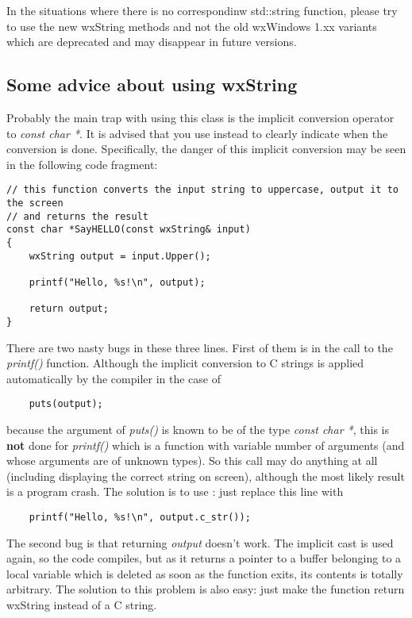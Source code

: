 In the situations where there is no correspondinw std::string function, please
try to use the new wxString methods and not the old wxWindows 1.xx variants
which are deprecated and may disappear in future versions.

\subsection{Some advice about using wxString}\label{wxstringadvices}

Probably the main trap with using this class is the implicit conversion operator to 
{\it const char *}. It is advised that you use 
instead to clearly indicate when the conversion is done. Specifically, the
danger of this implicit conversion may be seen in the following code fragment:

\begin{verbatim}
// this function converts the input string to uppercase, output it to the screen
// and returns the result
const char *SayHELLO(const wxString& input)
{
    wxString output = input.Upper();

    printf("Hello, %s!\n", output);

    return output;
}
\end{verbatim}

There are two nasty bugs in these three lines. First of them is in the call to the 
{\it printf()} function. Although the implicit conversion to C strings is applied
automatically by the compiler in the case of

\begin{verbatim}
    puts(output);
\end{verbatim}

because the argument of {\it puts()} is known to be of the type {\it const char *},
this is {\bf not} done for {\it printf()} which is a function with variable
number of arguments (and whose arguments are of unknown types). So this call may
do anything at all (including displaying the correct string on screen), although
the most likely result is a program crash. The solution is to use 
: just replace this line with

\begin{verbatim}
    printf("Hello, %s!\n", output.c_str());
\end{verbatim}

The second bug is that returning {\it output} doesn't work. The implicit cast is
used again, so the code compiles, but as it returns a pointer to a buffer
belonging to a local variable which is deleted as soon as the function exits,
its contents is totally arbitrary. The solution to this problem is also easy:
just make the function return wxString instead of a C string.

